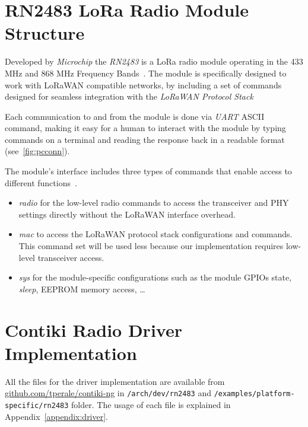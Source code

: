 \section{RN2483 LoRa Radio Module Structure}

Developed by \emph{Microchip} the \emph{RN2483} is a LoRa radio module operating in
the 433 MHz and 868 MHz Frequency Bands~\cite{microchip:rn2483}.
The module is specifically designed to work with LoRaWAN compatible networks,
by including a set of commands designed for seamless integration with the
\emph{LoRaWAN Protocol Stack}

Each communication to and from the module is done via \emph{UART} ASCII command,
making it easy for a human to interact with the module by typing commands
on a terminal and reading the response back in a readable format
(see~\ref{fig:pcconn}).



The module's interface includes three types of commands that enable access to
different functions~\cite{microchip:reference}.

\begin{itemize}
  \item \emph{radio} for the low-level radio commands to access the transceiver
    and PHY settings directly without the LoRaWAN interface overhead.
  \item \emph{mac} to access the LoRaWAN protocol stack configurations and
    commands. This command set will be used less because our implementation
    requires low-level transceiver access.
  \item \emph{sys} for the module-specific configurations such as the module
    GPIOs state, \emph{sleep}, EEPROM memory access, \ldots
\end{itemize}

\section{Contiki Radio Driver Implementation}

All the files for the driver implementation are available from
\href{https://github.com/tperale/contiki-ng}{github.com/tperale/contiki-ng}
in \lstinline{/arch/dev/rn2483} and
\lstinline{/examples/platform-specific/rn2483} folder.
The usage of each file is explained in Appendix~\ref{appendix:driver}.

\paragraph{}

